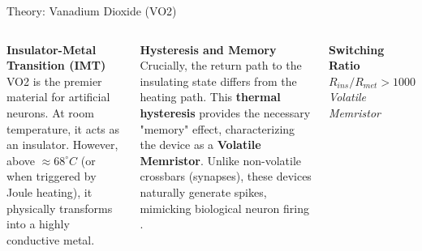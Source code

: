 \documentclass[aspectratio=169]{beamer}
\begin{document}
\begin{frame}{Theory: Vanadium Dioxide (VO2)}
    \begin{columns}
        \textbf{Insulator-Metal Transition (IMT)} \\
        \vspace{0.2cm}
        VO2 is the premier material for artificial neurons. At room temperature, it acts as an insulator. However, above $\approx 68^\circ C$ (or when triggered by Joule heating), it physically transforms into a highly conductive metal.
        
        \vspace{0.6cm}

        \textbf{Hysteresis and Memory} \\
        \vspace{0.2cm}
        Crucially, the return path to the insulating state differs from the heating path. This \textbf{thermal hysteresis} provides the necessary "memory" effect, characterizing the device as a \textbf{Volatile Memristor}. Unlike non-volatile crossbars (synapses), these devices naturally generate spikes, mimicking biological neuron firing \cite{liu}.
        
        \centering
        \large 
        \textbf{Switching Ratio}\\
        $R_{ins} / R_{met} > 1000$\\
        \vspace{1cm}
        \textit{Volatile Memristor}
    \end{columns}
\end{frame}
\end{document}
